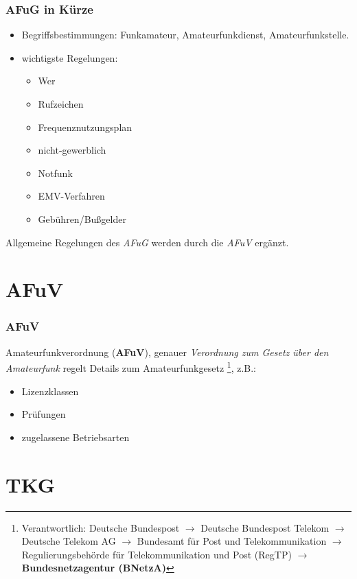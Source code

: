 \begin{frame}
  \frametitle{AFuG in Kürze}

  \begin{itemize}
    \item Begriffsbestimmungen: Funkamateur, Amateurfunkdienst,
      Amateurfunkstelle.
    \item wichtigste Regelungen:
      \begin{itemize}
        \item Wer
        \item Rufzeichen
        \item Frequenznutzungsplan
        \item nicht-gewerblich
        \item Notfunk
        \item EMV-Verfahren
        \item Gebühren/Bußgelder
      \end{itemize}
  \end{itemize}

  Allgemeine Regelungen des \emph{AFuG} werden durch die \emph{AFuV} ergänzt.

\end{frame}

\section{AFuV}

\begin{frame}
  \frametitle{AFuV}

  Amateurfunkverordnung (\textbf{AFuV}), genauer \emph{Verordnung zum Gesetz
  über den Amateurfunk} regelt Details zum Amateurfunkgesetz
  \footnote{Verantwortlich: Deutsche Bundespost $\rightarrow$ Deutsche
  Bundespost Telekom $\rightarrow$ Deutsche Telekom AG $\rightarrow$
  Bundesamt für Post und Telekommunikation $\rightarrow$ Regulierungsbehörde
  für Telekommunikation und Post (RegTP) $\rightarrow$
  \textbf{Bundesnetzagentur (BNetzA)}}, z.B.:

  \begin{itemize}
    \item Lizenzklassen
    \item Prüfungen
    \item zugelassene Betriebsarten
  \end{itemize}

\end{frame}

\section{TKG}

